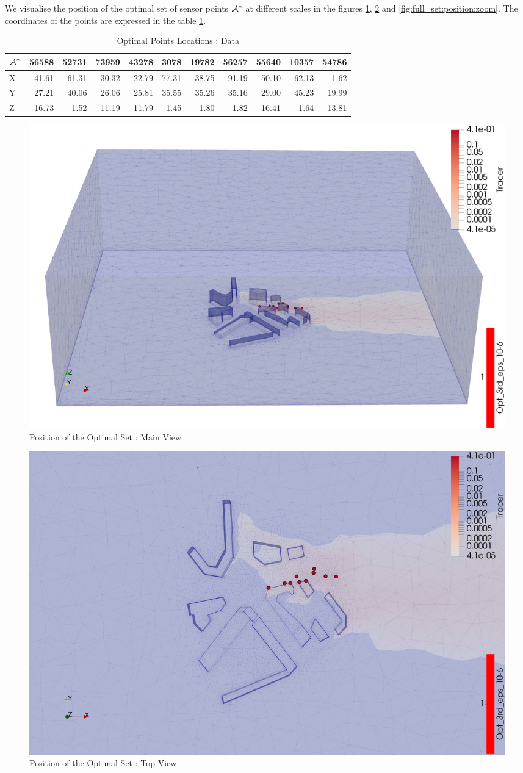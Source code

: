 We visualise the position of the optimal set of sensor points $\mathcal{A}^*$ at different scales in the figures \ref{fig:full_set:position:all}, \ref{fig:full_set:position:top} and \ref{fig:full_set:position:zoom}. The coordinates of the points are expressed in the table \ref{tab:full:data}. \\


\begin{table}[h]
\centering
\footnotesize
\begin{tabular}{l|rrrrrrrrrr}
\toprule
$\mathcal{A}^*$ &  56588 &  52731 &  73959 &  43278 &  3078  &  19782 &  56257 &  55640 &  10357 &  54786 \\ \midrule
X &  41.61 &  61.31 &  30.32 &  22.79 &  77.31 &  38.75 &  91.19 &  50.10 &  62.13 &   1.62 \\
Y &  27.21 &  40.06 &  26.06 &  25.81 &  35.55 &  35.26 &  35.16 &  29.00 &  45.23 &  19.99 \\
Z &  16.73 &   1.52 &  11.19 &  11.79 &   1.45 &   1.80 &   1.82 &  16.41 &   1.64 &  13.81 \\
\bottomrule
\end{tabular}
\caption{Optimal Points Locations : Data}
\label{tab:full:data}
\end{table}



\begin{figure}[h!]
\centering
\includegraphics[width=0.7\linewidth]{figures/MainOptimResults/alg3opteps10-6_sideall_screenshot}
\caption{Position of the Optimal Set : Main View}
\label{fig:full_set:position:all}
\end{figure}



\begin{figure}[h!]
\centering
\includegraphics[width=0.7\linewidth]{figures/MainOptimResults/alg3opteps10-6_top_screenshot}
\caption{Position of the Optimal Set : Top View}
\label{fig:full_set:position:top}
\end{figure}

